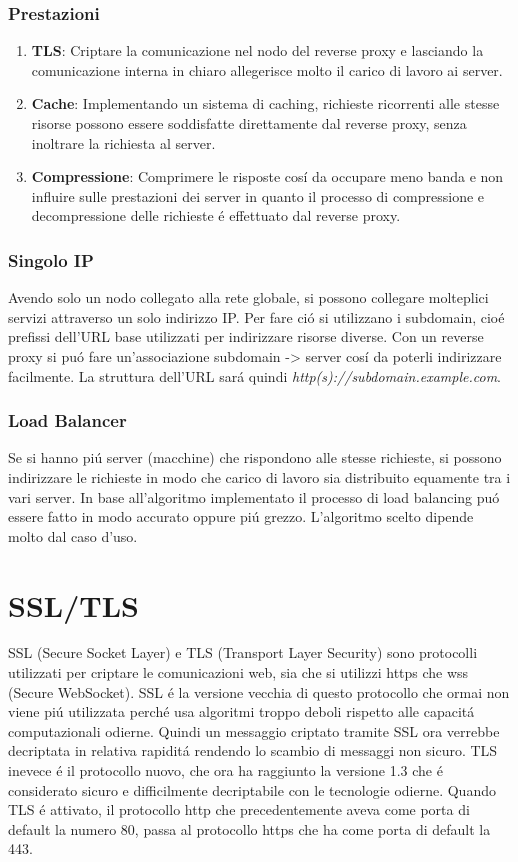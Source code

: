 \subsubsection{Prestazioni}
\begin{enumerate}
  \item \textbf{TLS}: Criptare la comunicazione nel nodo del reverse proxy e lasciando la comunicazione interna in chiaro allegerisce molto il carico di lavoro ai server.
  \item \textbf{Cache}: Implementando un sistema di caching, richieste ricorrenti alle stesse risorse possono essere soddisfatte direttamente dal reverse proxy, senza inoltrare la richiesta al server.
  \item \textbf{Compressione}: Comprimere le risposte cosí da occupare meno banda e non influire sulle prestazioni dei server in quanto il processo di compressione e decompressione delle richieste é effettuato dal reverse proxy.
\end{enumerate}

\subsubsection{Singolo IP}
Avendo solo un nodo collegato alla rete globale, si possono collegare molteplici servizi attraverso un solo indirizzo IP. Per fare ció si utilizzano i subdomain, cioé prefissi dell'URL base utilizzati per indirizzare risorse diverse. Con un reverse proxy si puó fare un'associazione subdomain -> server cosí da poterli indirizzare facilmente. La struttura dell'URL sará quindi \textit{http(s)://subdomain.example.com}.

\subsubsection{Load Balancer}
Se si hanno piú server (macchine) che rispondono alle stesse richieste, si possono indirizzare le richieste in modo che carico di lavoro sia distribuito equamente tra i vari server. In base all'algoritmo implementato il processo di load balancing puó essere fatto in modo accurato oppure piú grezzo. L'algoritmo scelto dipende molto dal caso d'uso.

\section{SSL/TLS}
\cite{tls}SSL (Secure Socket Layer) e TLS (Transport Layer Security) sono protocolli utilizzati per criptare le comunicazioni web, sia che si utilizzi https che wss (Secure WebSocket). SSL é la versione vecchia di questo protocollo che ormai non viene piú utilizzata perché usa algoritmi troppo deboli rispetto alle capacitá computazionali odierne. Quindi un messaggio criptato tramite SSL ora verrebbe decriptata in relativa rapiditá rendendo lo scambio di messaggi non sicuro. TLS inevece é il protocollo nuovo, che ora ha raggiunto la versione 1.3 che é considerato sicuro e difficilmente decriptabile con le tecnologie odierne. Quando TLS é attivato, il protocollo http che precedentemente aveva come porta di default la numero 80, passa al protocollo https che ha come porta di default la 443.
